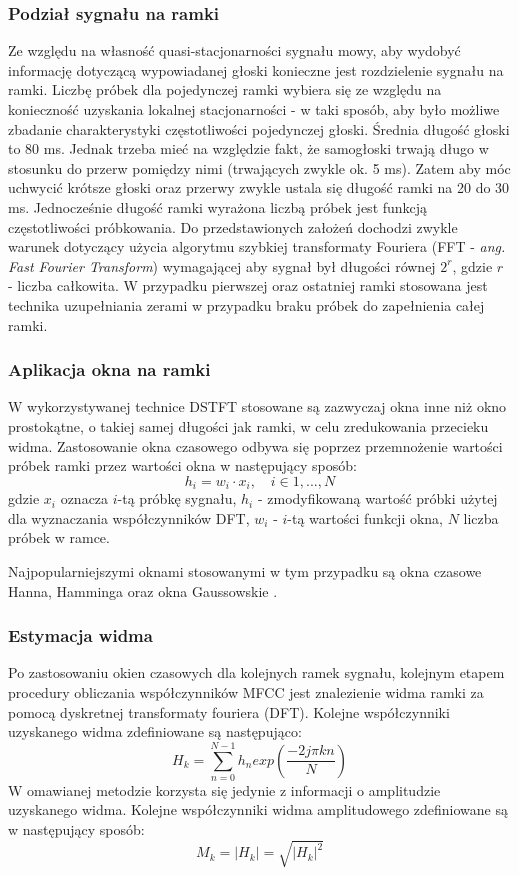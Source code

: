 \subsubsection{Podział sygnału na ramki}
Ze względu na własność quasi-stacjonarności sygnału mowy, aby wydobyć informację dotyczącą wypowiadanej głoski konieczne jest rozdzielenie sygnału na ramki.
Liczbę próbek dla pojedynczej ramki wybiera się ze względu na konieczność uzyskania lokalnej stacjonarności - w taki sposób, aby było możliwe zbadanie charakterystyki częstotliwości pojedynczej głoski. Średnia długość głoski to 80 ms. Jednak trzeba mieć na względzie fakt, że samogłoski trwają długo w stosunku do przerw pomiędzy nimi (trwających zwykle ok. 5 ms). Zatem aby móc uchwycić krótsze głoski oraz przerwy zwykle ustala się długość ramki na 20 do 30 ms. Jednocześnie długość ramki wyrażona liczbą próbek jest funkcją częstotliwości próbkowania. Do przedstawionych założeń dochodzi zwykle warunek dotyczący użycia algorytmu szybkiej transformaty Fouriera (FFT - \textit{ang. Fast Fourier Transform}) wymagającej aby sygnał był długości równej $2^r$, gdzie $r$ - liczba całkowita. W przypadku pierwszej oraz ostatniej ramki stosowana jest technika uzupełniania zerami w przypadku braku próbek do zapełnienia całej ramki.

\subsubsection{Aplikacja okna na ramki}
W wykorzystywanej technice DSTFT stosowane są zazwyczaj okna inne niż okno prostokątne, o takiej samej długości jak ramki, w celu zredukowania przecieku widma. Zastosowanie okna czasowego odbywa się poprzez przemnożenie wartości próbek ramki przez wartości okna w następujący sposób:
\begin{equation}
  h_i = w_i \cdot x_i, \quad i \in {1,...,N}
\end{equation}
gdzie $x_i$ oznacza $i$-tą próbkę sygnału, $h_i$ - zmodyfikowaną wartość próbki użytej dla wyznaczania współczynników DFT, $w_i$ - $i$-tą wartości funkcji okna, $N$ liczba próbek w ramce. 

Najpopularniejszymi oknami stosowanymi w tym przypadku są okna czasowe Hanna, Hamminga oraz okna Gaussowskie \cite{fosr}.

\subsubsection{Estymacja widma}
\label{stft}
Po zastosowaniu okien czasowych dla kolejnych ramek sygnału, kolejnym etapem procedury obliczania współczynników MFCC jest znalezienie widma ramki za pomocą dyskretnej transformaty fouriera (DFT). Kolejne współczynniki uzyskanego widma zdefiniowane są następująco:
\begin{equation}
  H_k = \sum^{N-1}_{n=0} h_n exp(\frac{-2j\pi kn}{N} )
\end{equation}
W omawianej metodzie korzysta się jedynie z informacji o amplitudzie uzyskanego widma. Kolejne współczynniki widma amplitudowego zdefiniowane są w następujący sposób:
\begin{equation}
  M_k = |H_k| = \sqrt{|H_k|^2}
\end{equation}

